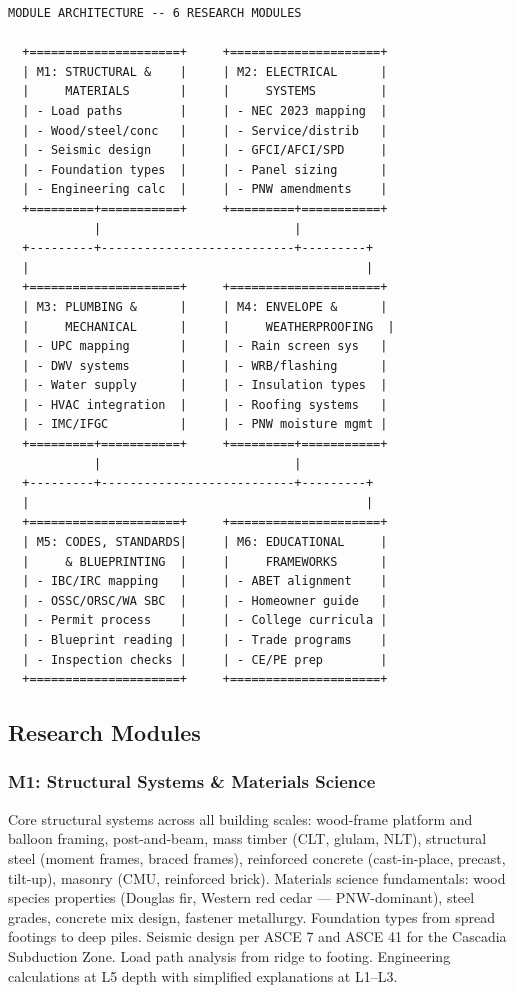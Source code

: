 \documentclass[11pt,letterpaper]{article}
\begin{document}
\begin{asciibox}
\begin{verbatim}
MODULE ARCHITECTURE -- 6 RESEARCH MODULES

  +=====================+     +=====================+
  | M1: STRUCTURAL &    |     | M2: ELECTRICAL      |
  |     MATERIALS       |     |     SYSTEMS         |
  | - Load paths        |     | - NEC 2023 mapping  |
  | - Wood/steel/conc   |     | - Service/distrib   |
  | - Seismic design    |     | - GFCI/AFCI/SPD     |
  | - Foundation types  |     | - Panel sizing      |
  | - Engineering calc  |     | - PNW amendments    |
  +=========+===========+     +=========+===========+
            |                           |
  +---------+---------------------------+---------+
  |                                               |
  +=====================+     +=====================+
  | M3: PLUMBING &      |     | M4: ENVELOPE &      |
  |     MECHANICAL      |     |     WEATHERPROOFING  |
  | - UPC mapping       |     | - Rain screen sys   |
  | - DWV systems       |     | - WRB/flashing      |
  | - Water supply      |     | - Insulation types  |
  | - HVAC integration  |     | - Roofing systems   |
  | - IMC/IFGC          |     | - PNW moisture mgmt |
  +=========+===========+     +=========+===========+
            |                           |
  +---------+---------------------------+---------+
  |                                               |
  +=====================+     +=====================+
  | M5: CODES, STANDARDS|     | M6: EDUCATIONAL     |
  |     & BLUEPRINTING  |     |     FRAMEWORKS      |
  | - IBC/IRC mapping   |     | - ABET alignment    |
  | - OSSC/ORSC/WA SBC  |     | - Homeowner guide   |
  | - Permit process    |     | - College curricula |
  | - Blueprint reading |     | - Trade programs    |
  | - Inspection checks |     | - CE/PE prep        |
  +=====================+     +=====================+
\end{verbatim}
\end{asciibox}

\subsection{Research Modules}

\subsubsection{M1: Structural Systems \& Materials Science}

Core structural systems across all building scales: wood-frame platform and balloon framing, post-and-beam, mass timber (CLT, glulam, NLT), structural steel (moment frames, braced frames), reinforced concrete (cast-in-place, precast, tilt-up), masonry (CMU, reinforced brick). Materials science fundamentals: wood species properties (Douglas fir, Western red cedar --- PNW-dominant), steel grades, concrete mix design, fastener metallurgy. Foundation types from spread footings to deep piles. Seismic design per ASCE 7 and ASCE 41 for the Cascadia Subduction Zone. Load path analysis from ridge to footing. Engineering calculations at L5 depth with simplified explanations at L1--L3.
\end{document}

